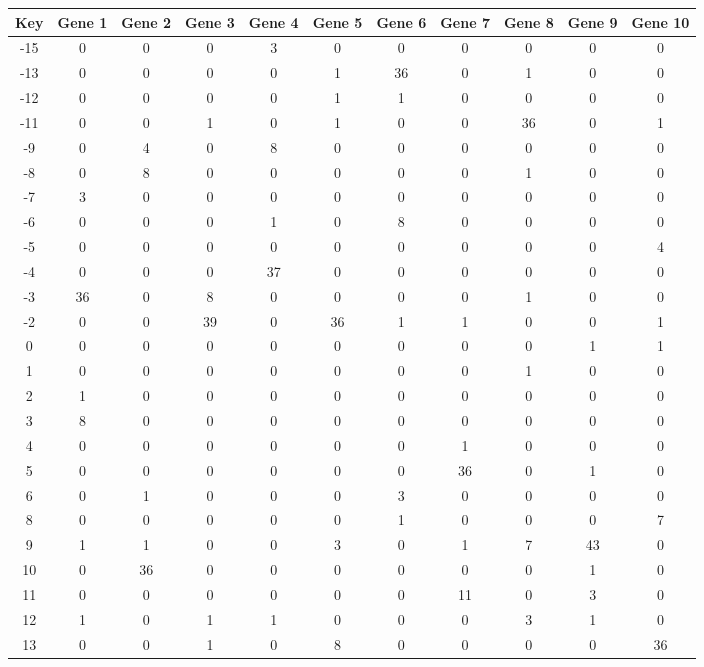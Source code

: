 \begin{tabular}{|c|c|c|c|c|c|c|c|c|c|c|}
\hline
Key & Gene 1 & Gene 2 & Gene 3 & Gene 4 & Gene 5 & Gene 6 & Gene 7 & Gene 8 & Gene 9 & Gene 10 \\
\hline
-15 & 0 & 0 & 0 & 3 & 0 & 0 & 0 & 0 & 0 & 0 \\
-13 & 0 & 0 & 0 & 0 & 1 & 36 & 0 & 1 & 0 & 0 \\
-12 & 0 & 0 & 0 & 0 & 1 & 1 & 0 & 0 & 0 & 0 \\
-11 & 0 & 0 & 1 & 0 & 1 & 0 & 0 & 36 & 0 & 1 \\
-9 & 0 & 4 & 0 & 8 & 0 & 0 & 0 & 0 & 0 & 0 \\
-8 & 0 & 8 & 0 & 0 & 0 & 0 & 0 & 1 & 0 & 0 \\
-7 & 3 & 0 & 0 & 0 & 0 & 0 & 0 & 0 & 0 & 0 \\
-6 & 0 & 0 & 0 & 1 & 0 & 8 & 0 & 0 & 0 & 0 \\
-5 & 0 & 0 & 0 & 0 & 0 & 0 & 0 & 0 & 0 & 4 \\
-4 & 0 & 0 & 0 & 37 & 0 & 0 & 0 & 0 & 0 & 0 \\
-3 & 36 & 0 & 8 & 0 & 0 & 0 & 0 & 1 & 0 & 0 \\
-2 & 0 & 0 & 39 & 0 & 36 & 1 & 1 & 0 & 0 & 1 \\
0 & 0 & 0 & 0 & 0 & 0 & 0 & 0 & 0 & 1 & 1 \\
1 & 0 & 0 & 0 & 0 & 0 & 0 & 0 & 1 & 0 & 0 \\
2 & 1 & 0 & 0 & 0 & 0 & 0 & 0 & 0 & 0 & 0 \\
3 & 8 & 0 & 0 & 0 & 0 & 0 & 0 & 0 & 0 & 0 \\
4 & 0 & 0 & 0 & 0 & 0 & 0 & 1 & 0 & 0 & 0 \\
5 & 0 & 0 & 0 & 0 & 0 & 0 & 36 & 0 & 1 & 0 \\
6 & 0 & 1 & 0 & 0 & 0 & 3 & 0 & 0 & 0 & 0 \\
8 & 0 & 0 & 0 & 0 & 0 & 1 & 0 & 0 & 0 & 7 \\
9 & 1 & 1 & 0 & 0 & 3 & 0 & 1 & 7 & 43 & 0 \\
10 & 0 & 36 & 0 & 0 & 0 & 0 & 0 & 0 & 1 & 0 \\
11 & 0 & 0 & 0 & 0 & 0 & 0 & 11 & 0 & 3 & 0 \\
12 & 1 & 0 & 1 & 1 & 0 & 0 & 0 & 3 & 1 & 0 \\
13 & 0 & 0 & 1 & 0 & 8 & 0 & 0 & 0 & 0 & 36 \\
\hline
\end{tabular}